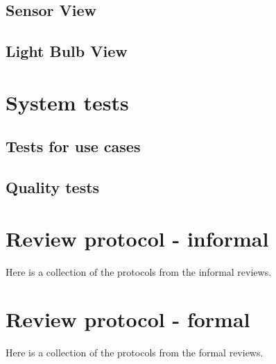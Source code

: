 \documentclass[a4paper]{article}
\begin{document}
\subsection{Sensor View}



\subsection{Light Bulb View}


\newpage
\section{System tests}

\subsection{Tests for use cases}


\subsection{Quality tests}


\newpage
\section{Review protocol - informal}
Here is a collection of the protocols from the informal reviews.

\newpage
\section{Review protocol - formal}
Here is a collection of the protocols from the formal reviews.
\end{document}
